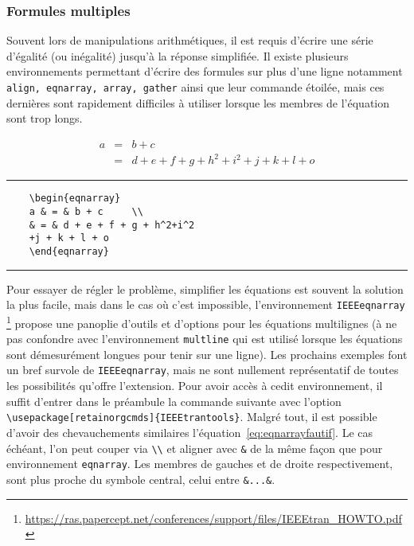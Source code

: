 \subsubsection{Formules multiples}
Souvent lors de manipulations arithmétiques, il est requis d'écrire une série d'égalité (ou inégalité) jusqu'à la réponse simplifiée. Il existe plusieurs environnements permettant d'écrire des formules sur plus d'une ligne notamment \verb|align, eqnarray, array, gather| ainsi que leur commande étoilée, mais ces dernières sont rapidement difficiles à utiliser lorsque les membres de l'équation sont trop longs.
%
\begin{table}[H]
	\centering
	\begin{eqnarray}
	a & = & b + c     \\
	& = & d + e + f + g + h^2 + i^2
	+j + k + l + o
	\label{eq:eqnarrayfautif}
	\end{eqnarray}
	\hrule
	\begin{verbatim}
	\begin{eqnarray}
	a & = & b + c     \\
	& = & d + e + f + g + h^2+i^2
	+j + k + l + o
	\end{eqnarray}		
	\end{verbatim}
	\hrule
\end{table}
%
\par Pour essayer de régler le problème, simplifier les équations est souvent la solution la plus facile, mais dans le cas où c'est impossible, l'environnement \verb|IEEEeqnarray| \footnote{\url{https://ras.papercept.net/conferences/support/files/IEEEtran_HOWTO.pdf}} propose une panoplie d'outils et d'options pour les équations multilignes (à ne pas confondre avec l'environnement \verb|multline| qui est utilisé lorsque les équations sont démesurément longues pour tenir sur une ligne). Les prochains exemples font un bref survole de \verb|IEEEeqnarray|, mais ne sont nullement représentatif de toutes les possibilités qu'offre l'extension. Pour avoir accès à cedit environnement, il suffit d'entrer dans le préambule la commande suivante avec l'option \verb|\usepackage[retainorgcmds]{IEEEtrantools}|. Malgré tout, il est possible d'avoir des chevauchements similaires l'équation~\ref{eq:eqnarrayfautif}. Le cas échéant, l'on peut couper via \verb|\\| et aligner avec \verb|&| de la même façon que pour environnement \verb|eqnarray|. Les membres de gauches et de droite respectivement, sont plus proche du symbole central, celui entre \verb|&...&|.
%
